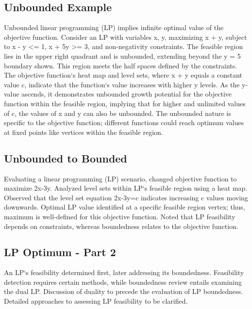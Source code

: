 \subsection*{Unbounded Example}
Unbounded linear programming (LP) implies infinite optimal value of the objective function.
Consider an LP with variables x, y, maximizing x + y, subject to x - y \textless{}= 1, x + 5y \textgreater{}= 3, and non-negativity constraints.
The feasible region lies in the upper right quadrant and is unbounded, extending beyond the y = 5 boundary shown.
This region meets the half spaces defined by the constraints.
The objective function`s heat map and level sets, where x + y equals a constant value c, indicate that the function`s value increases with higher y levels.
As the y-value ascends, it demonstrates unbounded growth potential for the objective function within the feasible region, implying that for higher and unlimited values of c, the values of x and y can also be unbounded.
The unbounded nature is specific to the objective function; different functions could reach optimum values at fixed points like vertices within the feasible region.

\subsection*{Unbounded to Bounded}
Evaluating a linear programming (LP) scenario, changed objective function to maximize 2x-3y.
Analyzed level sets within LP`s feasible region using a heat map.
Observed that the level set equation 2x-3y=c indicates increasing c values moving downwards.
Optimal LP value identified at a specific feasible region vertex; thus, maximum is well-defined for this objective function.
Noted that LP feasibility depends on constraints, whereas boundedness relates to the objective function.

\subsection*{LP Optimum - Part 2}
An LP`s feasibility determined first, later addressing its boundedness.
Feasibility detection requires certain methods, while boundedness review entails examining the dual LP\@.
Discussion of duality to precede the evaluation of LP boundedness.
Detailed approaches to assessing LP feasibility to be clarified.

